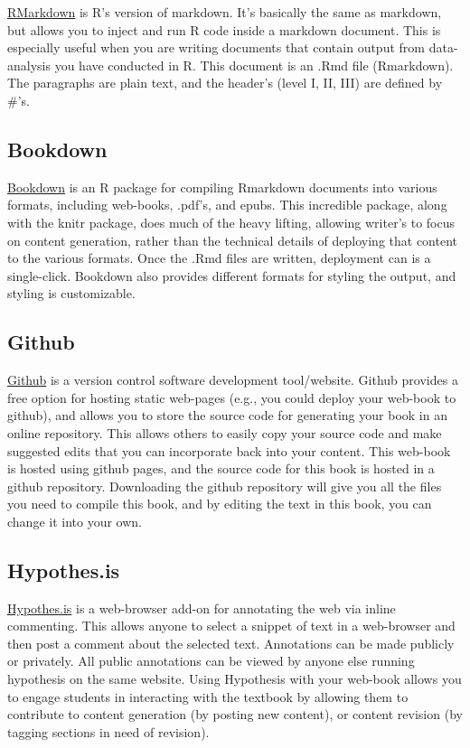 \documentclass[]{book}
\theoremstyle{definition}
\theoremstyle{definition}
\theoremstyle{definition}
\theoremstyle{remark}
\begin{document}
\href{http://rmarkdown.rstudio.com}{RMarkdown} is R's version of
markdown. It's basically the same as markdown, but allows you to inject
and run R code inside a markdown document. This is especially useful
when you are writing documents that contain output from data-analysis
you have conducted in R. This document is an .Rmd file (Rmarkdown). The
paragraphs are plain text, and the header's (level I, II, III) are
defined by \#'s.

\subsection{Bookdown}\label{bookdown}

\href{https://bookdown.org/yihui/bookdown/}{Bookdown} is an R package
for compiling Rmarkdown documents into various formats, including
web-books, .pdf's, and epubs. This incredible package, along with the
knitr package, does much of the heavy lifting, allowing writer's to
focus on content generation, rather than the technical details of
deploying that content to the various formats. Once the .Rmd files are
written, deployment can is a single-click. Bookdown also provides
different formats for styling the output, and styling is customizable.

\subsection{Github}\label{github}

\href{https://github.com}{Github} is a version control software
development tool/website. Github provides a free option for hosting
static web-pages (e.g., you could deploy your web-book to github), and
allows you to store the source code for generating your book in an
online repository. This allows others to easily copy your source code
and make suggested edits that you can incorporate back into your
content. This web-book is hosted using github pages, and the source code
for this book is hosted in a github repository. Downloading the github
repository will give you all the files you need to compile this book,
and by editing the text in this book, you can change it into your own.

\subsection{Hypothes.is}\label{hypothes.is}

\href{https://web.hypothes.is}{Hypothes.is} is a web-browser add-on for
annotating the web via inline commenting. This allows anyone to select a
snippet of text in a web-browser and then post a comment about the
selected text. Annotations can be made publicly or privately. All public
annotations can be viewed by anyone else running hypothesis on the same
website. Using Hypothesis with your web-book allows you to engage
students in interacting with the textbook by allowing them to contribute
to content generation (by posting new content), or content revision (by
tagging sections in need of revision).
\end{document}
